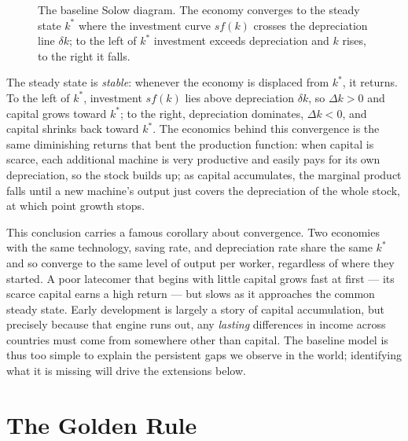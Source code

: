 \begin{figure}[h]
\centering

\caption{The baseline Solow diagram. The economy converges to the steady state $k^*$ where the investment curve $s f(k)$ crosses the depreciation line $\delta k$; to the left of $k^*$ investment exceeds depreciation and $k$ rises, to the right it falls.}
\label{fig:macro-2}
\end{figure}

The steady state is \emph{stable}: whenever the economy is displaced from $k^*$, it returns. To the left of $k^*$, investment $s f(k)$ lies above depreciation $\delta k$, so $\Delta k > 0$ and capital grows toward $k^*$; to the right, depreciation dominates, $\Delta k < 0$, and capital shrinks back toward $k^*$. The economics behind this convergence is the same diminishing returns that bent the production function: when capital is scarce, each additional machine is very productive and easily pays for its own depreciation, so the stock builds up; as capital accumulates, the marginal product falls until a new machine's output just covers the depreciation of the whole stock, at which point growth stops.


This conclusion carries a famous corollary about convergence. Two economies with the same technology, saving rate, and depreciation rate share the same $k^*$ and so converge to the same level of output per worker, regardless of where they started. A poor latecomer that begins with little capital grows fast at first --- its scarce capital earns a high return --- but slows as it approaches the common steady state. Early development is largely a story of capital accumulation, but precisely because that engine runs out, any \emph{lasting} differences in income across countries must come from somewhere other than capital. The baseline model is thus too simple to explain the persistent gaps we observe in the world; identifying what it is missing will drive the extensions below.

\section{The Golden Rule}

